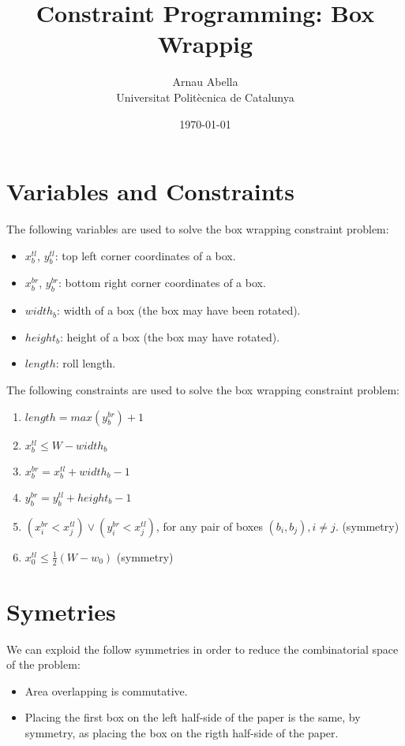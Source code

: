 \documentclass[12pt, a4paper]{article} %
\title{%
  Constraint Programming: Box Wrappig
}
\author{%
  Arnau Abella \\
  \large{Universitat Polit\`ecnica de Catalunya}
}
\date{\today}
\begin{document}
\maketitle

\section{Variables and Constraints}\label{variables}

The following variables are used to solve the box wrapping constraint problem:

\begin{itemize}
  \item $x^{tl}_b$, $y^{tl}_b$: top left corner coordinates of a box.
  \item $x^{br}_b$, $y^{br}_b$: bottom right corner coordinates of a box.
  \item $width_b$: width of a box (the box may have been rotated).
  \item $height_b$: height of a box (the box may have rotated).
  \item $length$: roll length.
\end{itemize}

The following constraints are used to solve the box wrapping constraint problem:

\begin{enumerate}[label=(\roman*)]
  \item $length = max(y^{br}_b) + 1$
  \item $x^{tl}_b \leq W - width_b$
  \item $x^{br}_b = x^{tl}_b + width_b - 1$
  \item $y^{br}_b = y^{tl}_b + height_b - 1$
  \item $(x^{br}_i < x^{tl}_j) \lor (y^{br}_i < x^{tl}_j)$, for any pair of boxes $(b_i, b_j), i \neq j$. (symmetry)
  \item $x^{tl}_0 \leq \frac{1}{2}(W - w_0)$ \hspace{0.3cm} (symmetry)
\end{enumerate}

\section{Symetries}\label{opt}

We can exploid the follow symmetries in order to reduce the combinatorial space of the problem:

\begin{itemize}
  \item Area overlapping is commutative.
  \item Placing the first box on the left half-side of the paper is the same, by symmetry, as placing the box on the rigth half-side of the paper.
\end{itemize}
\end{document}
